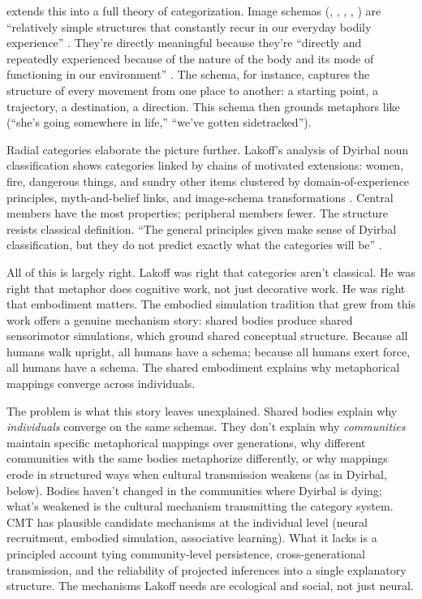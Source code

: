 \documentclass[12pt]{article}
\begin{document}
\textcite{lakoff1987} extends this into a full theory of categorization. Image schemas (, , , , ) are \enquote{relatively simple structures that constantly recur in our everyday bodily experience} \citep[267]{lakoff1987}. They're directly meaningful because they're \enquote{directly and repeatedly experienced because of the nature of the body and its mode of functioning in our environment} \citep[267]{lakoff1987}. The  schema, for instance, captures the structure of every movement from one place to another: a starting point, a trajectory, a destination, a direction. This schema then grounds metaphors like  (\enquote{she's going somewhere in life,} \enquote{we've gotten sidetracked}).

Radial categories elaborate the picture further. Lakoff's analysis of Dyirbal noun classification shows categories linked by chains of motivated extensions: women, fire, dangerous things, and sundry other items clustered by domain-of-experience principles, myth-and-belief links, and image-schema transformations \citep[Ch.~6]{lakoff1987}. Central members have the most properties; peripheral members fewer. The structure resists classical definition. \enquote{The general principles given make sense of Dyirbal classification, but they do not predict exactly what the categories will be} \citep[Ch.~6]{lakoff1987}.

All of this is largely right. Lakoff was right that categories aren't classical. He was right that metaphor does cognitive work, not just decorative work. He was right that embodiment matters. The embodied simulation tradition that grew from this work offers a genuine mechanism story: shared bodies produce shared sensorimotor simulations, which ground shared conceptual structure. Because all humans walk upright, all humans have a  schema; because all humans exert force, all humans have a  schema. The shared embodiment explains why metaphorical mappings converge across individuals.

The problem is what this story leaves unexplained. Shared bodies explain why \emph{individuals} converge on the same schemas. They don't explain why \emph{communities} maintain specific metaphorical mappings over generations, why different communities with the same bodies metaphorize differently, or why mappings erode in structured ways when cultural transmission weakens (as in Dyirbal, below). Bodies haven't changed in the communities where Dyirbal is dying; what's weakened is the cultural mechanism transmitting the category system. CMT has plausible candidate mechanisms at the individual level (neural recruitment, embodied simulation, associative learning). What it lacks is a principled account tying community-level persistence, cross-generational transmission, and the reliability of projected inferences into a single explanatory structure. The mechanisms Lakoff needs are ecological and social, not just neural.
\end{document}
